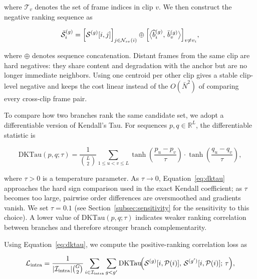 \documentclass[symmetry,article,submit,pdftex,moreauthors]{Definitions/mdpi}
\providecommand{\DIFadd}[1]{{\protect\color{blue}\uwave{#1}}} %
\providecommand{\DIFaddbegin}{} %
\providecommand{\DIFaddend}{} %
\begin{document}
where $\mathcal{T}_v$ denotes the set of frame indices in clip $v$. We then construct the negative ranking sequence as

\begin{equation}
\bar{\mathcal{S}}_i^{(g)} =
\Bigl[\mathcal{S}^{(g)}[i,j]\Bigr]_{j\in\mathcal{N}_{sv}(i)}
\oplus
\Bigl[\bigl\langle \widehat{b}_i^{(g)},\,\bar{b}_v^{(g)} \bigr\rangle\Bigr]_{v\neq v_i},
\end{equation}

where $\oplus$ denotes sequence concatenation. Distant frames from the same clip are hard negatives: they share content and degradation with the anchor but are no longer immediate neighbors. Using one centroid per other clip gives a stable clip-level negative and keeps the cost linear instead of \DIFaddbegin \DIFadd{incurring }\DIFaddend the $O(\bar{N}^2)$ \DIFaddbegin \DIFadd{cost }\DIFaddend of comparing every cross-clip frame pair.

To compare how two branches rank the same candidate set, we adopt a differentiable version of Kendall's Tau. For sequences $p,q\in\mathbb{R}^{L}$, the differentiable statistic is

\begin{equation}
\mathrm{DKTau}(p,q;\tau)
= \frac{1}{\binom{L}{2}}
\sum_{1\le u < v \le L}
\tanh\!\!\left(\frac{p_u-p_v}{\tau}\right)
\cdot
\tanh\!\!\left(\frac{q_u-q_v}{\tau}\right),
\label{eq:dktau}
\end{equation}

where $\tau>0$ is a temperature parameter. As $\tau\rightarrow 0$, Equation~\eqref{eq:dktau} approaches the hard sign comparison used in the exact Kendall coefficient; as $\tau$ becomes too large, pairwise order differences are oversmoothed and gradients vanish. We set $\tau=0.1$ (see Section~\ref{subsec:sensitivity} for the sensitivity to this choice). A lower value of $\mathrm{DKTau}(p,q;\tau)$ indicates weaker ranking correlation between branches and therefore stronger branch complementarity.

Using Equation~\eqref{eq:dktau}, we compute the positive-ranking correlation loss as

\begin{equation}
\mathcal{L}_{\text{intra}} =
\frac{1}{|\mathcal{I}_{\text{intra}}| \binom{G}{2}}
\sum_{i\in\mathcal{I}_{\text{intra}}}
\sum_{g < g'}
\mathrm{DKTau}\!\Bigl(
\mathcal{S}^{(g)}[i,\mathcal{P}(i)],\,
\mathcal{S}^{(g')}[i,\mathcal{P}(i)];\,\tau
\Bigr),
\label{eq:loss_intra}
\end{equation}
\end{document}
